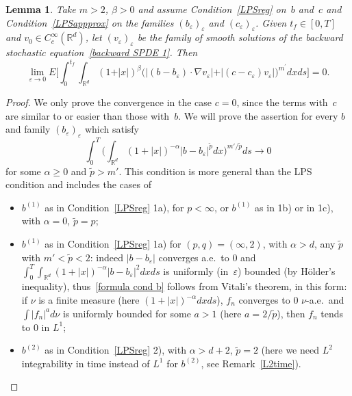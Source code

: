 \documentclass[a4paper,10pt]{article}
\newtheorem{lemma}[theorem]{Lemma}
\newcommand\1{\mathbbm{1}}
\newcommand{\mr}{\mathbb{R}}
\newcommand{\td}{\tilde}
\newcommand{\eps}{\varepsilon}
\numberwithin{equation}{section}
\begin{document}
\begin{lemma}
\label{lemma tool stoch} 
Take $m>2$, $\beta>0$ and assume Condition~\ref{LPSreg} on~$b$ and~$c$ and Condition~\ref{LPSappprox} on the families $(b_\eps)_\eps$ and $(c_\eps)_\eps$. Given $t_{f}\in [0,T]$ and $v_{0}\in C_{c}^{\infty}(\mathbb{R}^{d})$, let $(v_{\eps})_\eps$ be the family of smooth solutions of the backward stochastic equation~\eqref{backward SPDE 1}. Then
\begin{equation*}
\lim_{\eps\rightarrow0} E \bigg[ \int_{0}^{t_{f}}\int_{\mathbb{R}^{d}}(
1+\vert x \vert )^{\beta} \big( \vert (  b-b_{\eps})  \cdot\nabla v_{\eps} \vert + \vert (c-c_{\eps})  v_{\eps} \vert \big)^{m^{\prime}}dxds \bigg] =0 .
\end{equation*}
\end{lemma}

\begin{proof}
We only prove the convergence in the case $c=0$, since the terms with~$c$ are similar to or easier than those with~$b$. We will prove the assertion for every $b$ and family $(b_\eps)_\eps$ which satisfy
\begin{equation}
\int^T_0 \Big( \int_{\mr^d}(1+|x|)^{-\alpha}|b-b_\eps|^{\td{p}}dx \Big)^{m'/\td{p}}ds\rightarrow0\label{formula cond b}
\end{equation}
for some $\alpha\ge0$ and $\td{p}>m'$. This condition is more general than the LPS condition and includes the cases of
\begin{itemize}
 \item $b^{(1)}$ as in Condition~\ref{LPSreg} 1a), for $p<\infty$, or $b^{(1)}$ as in 1b) or in 1c), with $\alpha=0$, $\td{p}=p$;
 \item $b^{(1)}$ as in Condition~\ref{LPSreg} 1a) for $(p,q)=(\infty,2)$, with $\alpha>d$, any $\td{p}$ with $m'<\td{p}<2$: indeed $|b-b_\eps|$ converges a.e.~to $0$ and $\int^T_0\int_{\mr^d}(1+|x|)^{-\alpha}|b-b_\eps|^2dxds$ is uniformly (in~$\eps$) bounded (by H\"older's inequality), thus~\eqref{formula cond b} follows from Vitali's theorem, in this form: if $\nu$ is a finite measure (here $(1+|x|)^{-\alpha}dxds$), $f_n$ converges to $0$ $\nu$-a.e.~and $\int|f_n|^ad\nu$ is uniformly bounded for some $a>1$ (here $a=2/\td{p}$), then $f_n$ tends to $0$ in $L^1$;
 \item $b^{(2)}$ as in Condition~\ref{LPSreg} 2), with $\alpha>d+2$, $\td{p}=2$ (here we need $L^2$ integrability in time instead of $L^1$ for $b^{(2)}$, see Remark~\ref{L2time}).
\end{itemize}


\end{proof}
\end{document}
